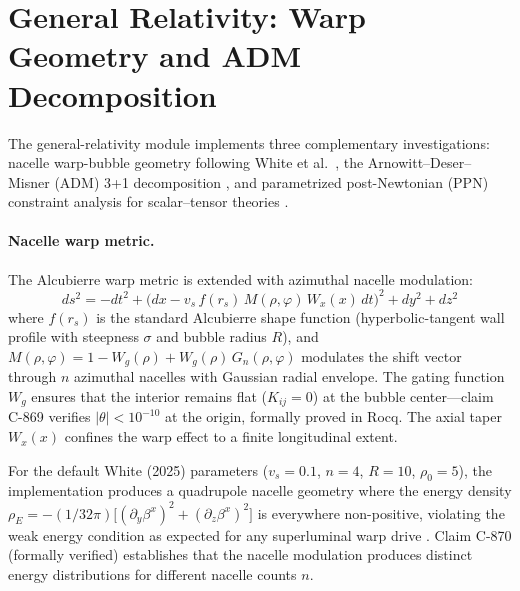 \documentclass[12pt,openany]{report}
\theoremstyle{definition}
\theoremstyle{plain}
\theoremstyle{remark}
\begin{document}
\section{General Relativity: Warp Geometry and ADM Decomposition}

The general-relativity module implements three complementary
investigations: nacelle warp-bubble geometry following
White et al.\ \cite{White2025CQG}, the Arnowitt--Deser--Misner (ADM)
3+1 decomposition \cite{ADM1962,Baumgarte2010}, and parametrized
post-Newtonian (PPN) constraint analysis for scalar--tensor
theories \cite{Will2014LivingReview}.

\paragraph{Nacelle warp metric.}
The Alcubierre warp metric \cite{Alcubierre1994WarpDrive} is extended with
azimuthal nacelle modulation:
\begin{equation}
  ds^2 = -dt^2 + \bigl(dx - v_s\, f(r_s)\, M(\rho,\varphi)\, W_x(x)\,dt\bigr)^2
    + dy^2 + dz^2
  \label{eq:nacelle-metric}
\end{equation}
where $f(r_s)$ is the standard Alcubierre shape function
(hyperbolic-tangent wall profile with steepness $\sigma$ and bubble
radius $R$), and $M(\rho,\varphi) = 1 - W_g(\rho) + W_g(\rho)\,
G_n(\rho,\varphi)$ modulates the shift vector through $n$ azimuthal
nacelles with Gaussian radial envelope.  The gating function $W_g$
ensures that the interior remains flat ($K_{ij} = 0$) at the bubble
center---claim C-869 verifies $|\theta| < 10^{-10}$ at the
origin, formally proved in Rocq.  The axial taper $W_x(x)$ confines
the warp effect to a finite longitudinal extent.

For the default White (2025) parameters ($v_s = 0.1$, $n = 4$, $R = 10$,
$\rho_0 = 5$), the implementation produces a quadrupole nacelle
geometry where the energy density
$\rho_E = -(1/32\pi)\bigl[(\partial_y \beta^x)^2
+ (\partial_z \beta^x)^2\bigr]$ is everywhere non-positive, violating
the weak energy condition as expected for any superluminal warp
drive \cite{Pfenning1997UnphysicalWarp}.  Claim C-870 (formally verified)
establishes that the nacelle modulation produces distinct energy
distributions for different nacelle counts $n$.
\end{document}
